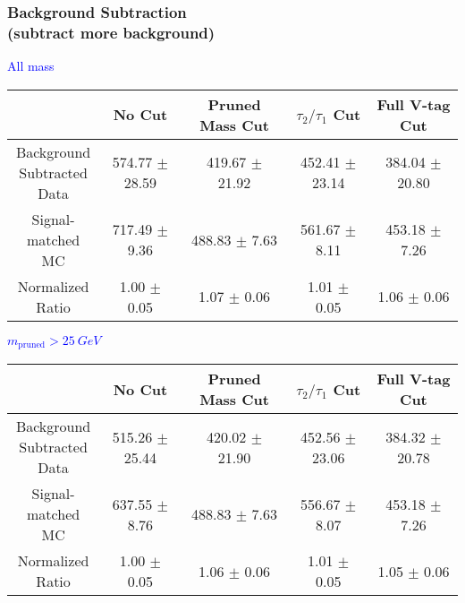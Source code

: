 \documentclass{beamer}
\begin{document}
\begin{frame}
  \frametitle{Background Subtraction \\ (subtract more background)}
  \begin{adjustwidth}{-1.5em}{-1.5em}
    \centering
    \vspace{6pt}
    \textcolor{blue}{All mass}
    \vspace{6pt}

    {\scriptsize
      \begin{tabular}{c | c | c | c | c}
        \hline
        & No Cut & Pruned Mass Cut & $\tau_2/\tau_1$ Cut & Full V-tag Cut \\
        \hline
        \makecell{Background \\ Subtracted \\ Data} & 574.77 $\pm$ 28.59 & 419.67 $\pm$ 21.92 & 452.41 $\pm$ 23.14 & 384.04 $\pm$ 20.80 \\
        \makecell{Signal-\\ matched MC} & 717.49 $\pm$ 9.36 & 488.83 $\pm$ 7.63 & 561.67 $\pm$ 8.11 & 453.18 $\pm$ 7.26 \\
        \hline
        \makecell{Normalized \\ Ratio} & 1.00 $\pm$ 0.05 & 1.07 $\pm$ 0.06 & 1.01 $\pm$ 0.05 & 1.06 $\pm$ 0.06 \\
        \hline
      \end{tabular}
    }

    \vspace{6pt}
    \textcolor{blue}{$m_\text{pruned} > \SI{25}{GeV}$}
    \vspace{6pt}

    {\scriptsize
      \begin{tabular}{c | c | c | c | c}
        \hline
        & No Cut & Pruned Mass Cut & $\tau_2/\tau_1$ Cut & Full V-tag Cut \\
        \hline
        \makecell{Background \\ Subtracted \\ Data} & 515.26 $\pm$ 25.44 & 420.02 $\pm$ 21.90 & 452.56 $\pm$ 23.06 & 384.32 $\pm$ 20.78 \\
        \makecell{Signal-\\ matched MC} & 637.55 $\pm$ 8.76 & 488.83 $\pm$ 7.63 & 556.67 $\pm$ 8.07 & 453.18 $\pm$ 7.26 \\
        \hline
        \makecell{Normalized \\ Ratio} & 1.00 $\pm$ 0.05 & 1.06 $\pm$ 0.06 & 1.01 $\pm$ 0.05 & 1.05 $\pm$ 0.06 \\
        \hline
      \end{tabular}
    }
  \end{adjustwidth}
\end{frame}
\end{document}
